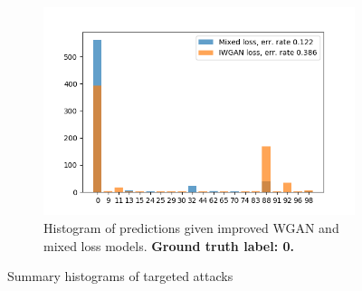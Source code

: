 \begin{figure}[t]
\begin{subfigure}[b]{0.5\linewidth}
        \includegraphics[width=\textwidth]{./fig/pred_comparisson_spk0.png}
        \caption{Histogram of predictions given improved WGAN and mixed loss models. \textbf{Ground truth label: 0.}}
        \label{fig:pred_comp_spk0}
    \end{subfigure}
    \caption{Summary histograms of targeted attacks}
    \label{fig:confusion_matrices}
\end{figure}
